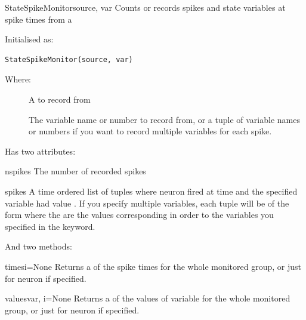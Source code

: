 \documentclass[letterpaper,10pt]{manual}
\begin{document}
\hypertarget{brian.StateSpikeMonitor}{}\begin{classdesc}{StateSpikeMonitor}{source, var}
Counts or records spikes and state variables at spike times from a \hyperlink{brian.NeuronGroup}{}

Initialised as:

\begin{Verbatim}[commandchars=@\[\]]
StateSpikeMonitor(source, var)
\end{Verbatim}

Where:
\begin{description}
\item[]
A \hyperlink{brian.NeuronGroup}{} to record from

\item[]
The variable name or number to record from, or a tuple of variable names or numbers
if you want to record multiple variables for each spike.

\end{description}

Has two attributes:


\hypertarget{brian.StateSpikeMonitor.nspikes}{}\begin{memberdesc}{nspikes}
The number of recorded spikes
\end{memberdesc}


\hypertarget{brian.StateSpikeMonitor.spikes}{}\begin{memberdesc}{spikes}
A time ordered list of tuples  where neuron  fired
at time  and the specified variable had value . If you
specify multiple variables, each tuple will be of the form
 where the  are the values corresponding
in order to the variables you specified in the  keyword.
\end{memberdesc}

And two methods:


\hypertarget{brian.StateSpikeMonitor.times}{}\begin{methoddesc}{times}{i=None}
Returns a  of the spike times for the whole monitored
group, or just for neuron  if specified.
\end{methoddesc}


\hypertarget{brian.StateSpikeMonitor.values}{}\begin{methoddesc}{values}{var, i=None}
Returns a  of the values of variable  for the
whole monitored group, or just for neuron  if specified.
\end{methoddesc}
\end{classdesc}
\end{document}
